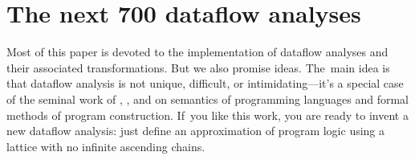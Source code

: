 \documentclass[blockstyle,preprint,natbib,nocopyrightspace]{sigplanconf}
\def\authornote#1{\unskip\relax}
\newcommand{\simon}[1]{\authornote{SLPJ: #1}}
\newcommand{\norman}[1]{\authornote{NR: #1}}
\let\remark\norman
\newcommand\seclabel[1]{\label{sec:#1}}
\begin{document}
\section{The next 700 dataflow analyses}

\seclabel{logic}
\seclabel{next-700}



Most of this paper is devoted to the implementation of dataflow
analyses and their associated transformations.
But we also promise ideas.
The~main idea is that dataflow analysis is not unique,
difficult, or intimidating---it's a special case of 
the seminal work of
\citet{floyd:assigning-meanings},
\citet{hoare:axiomatic-basis},
and
\citet{dijkstra:discipline}
on semantics of programming languages and
 formal methods of program construction.
If~you like this work, you are ready to invent a new
dataflow analysis:
just define an approximation of program logic
using a lattice with no infinite ascending chains.
\end{document}
